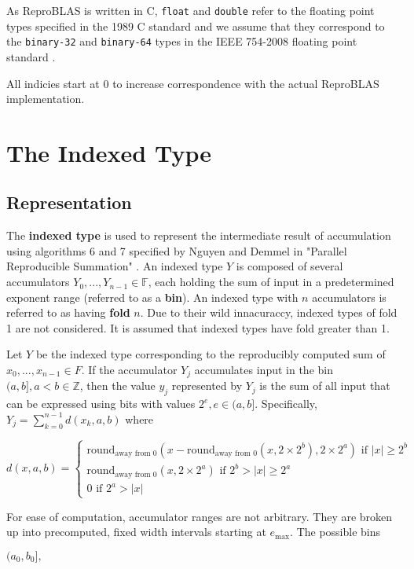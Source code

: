 \documentclass[12pt]{article}
\providecommand{\F}{\ensuremath{\mathbb{F}}}
\providecommand{\Z}{\ensuremath{\mathbb{Z}}}
\providecommand{\max}{\ensuremath{\text{max}}}
\providecommand{\roundfromzero}{\ensuremath{\text{round}_\text{away from 0}}}
\theoremstyle{plain}
\begin{document}
  As ReproBLAS is written in C, \verb|float| and \verb|double| refer to the floating point types specified in the 1989 C standard \cite{c89} and we assume that they correspond to the \verb|binary-32| and \verb|binary-64| types in the IEEE 754-2008 floating point standard \cite{ieee754}.

  All indicies start at 0 to increase correspondence with the actual ReproBLAS implementation.

\section{The Indexed Type}
  \subsection{Representation}
    The \textbf{indexed type} is used to represent the intermediate result of accumulation using algorithms 6 and 7 specified by Nguyen and Demmel in "Parallel Reproducible Summation" \cite{repsum}.
    An indexed type $Y$ is composed of several accumulators $Y_0, ..., Y_{n - 1} \in \F$, each holding the sum of input in a predetermined exponent range (referred to as a \textbf{bin}). An indexed type with $n$ accumulators is referred to as having \textbf{fold} $n$. Due to their wild innacuraccy, indexed types of fold 1 are not considered. It is assumed that indexed types have fold greater than 1.

    Let $Y$ be the indexed type corresponding to the reproducibly computed sum of $x_0, ..., x_{n - 1} \in F$.
    If the accumulator $Y_j$ accumulates input in the bin $(a, b], a < b \in \Z$, then the value $y_j$ represented by $Y_j$ is the sum of all input that can be expressed using bits with values $2^e, e \in (a, b]$. Specifically, $Y_j = \sum\limits_{k = 0}^{n - 1}d(x_k, a, b)$ where

    $d(x, a, b) = \begin{cases}\roundfromzero(x - \roundfromzero(x, 2 \times 2^b), 2 \times 2^a) \text{ if } |x| \geq 2^b \\ \roundfromzero(x, 2 \times 2^a) \text{ if } 2^b > |x| \geq 2^a \\ 0 \text{ if } 2^a > |x| \end{cases}$

    For ease of computation, accumulator ranges are not arbitrary. They are broken up into precomputed, fixed width intervals starting at $e_{\max}$. The possible bins

    $(a_0, b_0],$
\end{document}
